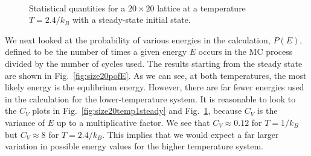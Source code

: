 \documentclass[12pt]{article}
\numberwithin{equation}{section}
\begin{document}
\begin{figure}[h]
\begin{center}
 \\
\caption{Statistical quantities for a $20\times20$ lattice at a temperature $T=2.4/k_{B}$ with a steady-state initial state.}
\label{fig:size20temp24steady}
\end{center}
\end{figure}

\par We next looked at the probability of various energies in the calculation, $P(E)$, defined to be the number of times a given energy $E$ occurs in the MC process divided by the number of cycles used.  The results starting from the steady state are shown in Fig.~\ref{fig:size20pofE}.  As we can see, at both temperatures, the most likely energy is the equlibrium energy.  However, there are far fewer energies used in the calculation for the lower-temperature system.  It is reasonable to look to the $C_{V}$ plots in Fig.~\ref{fig:size20temp1steady} and Fig.~\ref{fig:size20temp24steady}, because $C_{V}$ is the variance of $E$ up to a multiplicative factor.  We see that $C_{V}\approx0.12$ for $T=1/k_{B}$ but $C_{V}\approx8$ for $T=2.4/k_{B}$.  This implies that we would expect a far larger variation in possible energy values for the higher temperature system.
\end{document}
